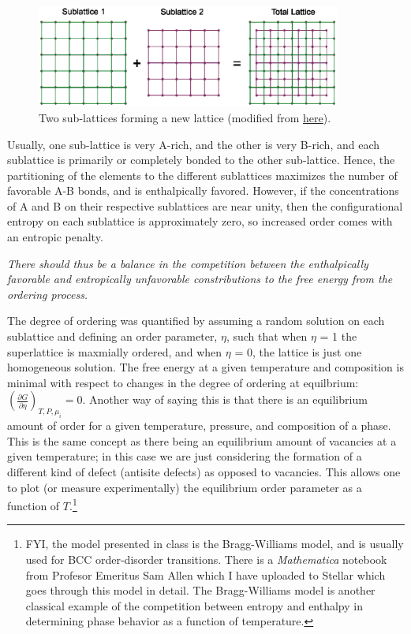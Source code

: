\documentclass[12pt]{article}
\begin{document}
\begin{figure}[h]
\centering
\includegraphics[width=10cm]{regularsolutionsandBraggwilliamsnotes_gr7}
\caption{Two sub-lattices forming a new lattice (modified from \href{http://home.iitk.ac.in/\~anandh/E-book/sublattice.ppt}{here}).}
\label{sublattices}
\end{figure}

Usually, one sub-lattice is very A-rich, and the other is very B-rich, and each sublattice is primarily or completely bonded to the other sub-lattice.
Hence, the partitioning of the elements to the different sublattices maximizes the number of favorable A-B bonds, and is enthalpically favored. However,
if the concentrations of A and B on their respective sublattices are near unity, then the configurational entropy on each sublattice is approximately zero, so increased order comes with an entropic penalty. \par
\emph{There should thus be a balance in the competition between the enthalpically favorable and entropically unfavorable
constributions to the free energy from the ordering process.} \par
The degree of ordering was quantified by assuming a random solution on each sublattice and defining an
order parameter, $\eta $, such that when $\eta $ = 1 the superlattice is maxmially ordered, and when $\eta $ = 0, the lattice is just one homogeneous solution. The free energy at a given temperature and composition is minimal with respect to changes in the degree of ordering at equilbrium: \(\left(\frac{\partial
G}{\partial \eta }\right)_{T,P,\mu _i}=0\). Another way of saying this is that there is an equilibrium amount of order for a given temperature, pressure,
and composition of a phase. This is the same concept as there being an equilibrium amount of vacancies at a given temperature; in this case we are
just considering the formation of a different kind of defect (antisite defects) as opposed to vacancies. This allows one to plot (or measure experimentally)
the equilibrium order parameter as a function of $T$.\footnote{FYI, the model presented in class is the Bragg-Williams model, and is usually used for BCC order-disorder transitions. There is a \textit{Mathematica} notebook from Profesor Emeritus Sam Allen which I have uploaded to Stellar which goes through this model in detail. The Bragg-Williams model is another classical example of the competition between entropy and enthalpy in determining phase behavior as a function of temperature.}
\end{document}
